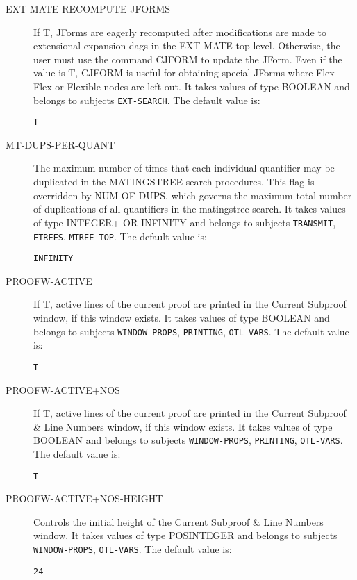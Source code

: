 \begin{description} 
\item[EXT-MATE-RECOMPUTE-JFORMS]  
If T, JForms are eagerly recomputed after modifications are made to
extensional expansion dags in the EXT-MATE top level.  Otherwise, the
user must use the command CJFORM to update the JForm.  Even if the
value is T, CJFORM is useful for obtaining special JForms where
Flex-Flex or Flexible nodes are left out.
It takes values of type BOOLEAN and belongs to subjects \texttt{EXT-SEARCH}.  The default value is: \begin{lstlisting}
T
\end{lstlisting}

\item[MT-DUPS-PER-QUANT]  
The maximum number of times that each individual quantifier
may be duplicated in the MATINGSTREE search procedures. This flag is 
overridden by NUM-OF-DUPS, which governs the maximum total number of 
duplications of all quantifiers in the matingstree search.
It takes values of type INTEGER+-OR-INFINITY and belongs to subjects \texttt{TRANSMIT}, \texttt{ETREES}, \texttt{MTREE-TOP}.  The default value is: \begin{lstlisting}
INFINITY
\end{lstlisting}

\item[PROOFW-ACTIVE]  
If T, active lines of the current proof are printed in the 
Current Subproof window, if this window exists.
It takes values of type BOOLEAN and belongs to subjects \texttt{WINDOW-PROPS}, \texttt{PRINTING}, \texttt{OTL-VARS}.  The default value is: \begin{lstlisting}
T
\end{lstlisting}

\item[PROOFW-ACTIVE+NOS]  
If T, active lines of the current proof are printed in the 
Current Subproof \&  Line Numbers window, if this window exists.
It takes values of type BOOLEAN and belongs to subjects \texttt{WINDOW-PROPS}, \texttt{PRINTING}, \texttt{OTL-VARS}.  The default value is: \begin{lstlisting}
T
\end{lstlisting}

\item[PROOFW-ACTIVE+NOS-HEIGHT]  
Controls the initial height of the Current Subproof \&  Line Numbers
window.
It takes values of type POSINTEGER and belongs to subjects \texttt{WINDOW-PROPS}, \texttt{OTL-VARS}.  The default value is: \begin{lstlisting}
24
\end{lstlisting}


\end{description}
